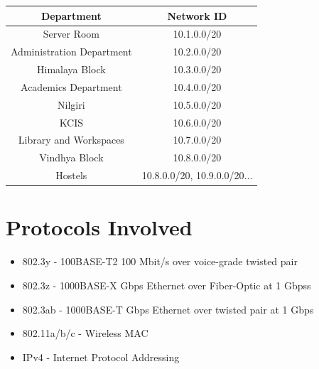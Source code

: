 \documentclass{article}
\begin{document}
\begin{center}
	\begin{tabular}{ |c|c| }
		\hline
		\textbf{Department} & \textbf{Network ID} \\ 
		\hline
		Server Room & 10.1.0.0/20 \\  
		\hline
		Administration Department & 10.2.0.0/20 \\
		\hline
		Himalaya Block & 10.3.0.0/20 \\
		\hline
		Academics Department & 10.4.0.0/20 \\
		\hline
		Nilgiri & 10.5.0.0/20 \\
		\hline
		KCIS & 10.6.0.0/20 \\
		\hline
		Library and Workspaces & 10.7.0.0/20 \\
		\hline
		Vindhya Block & 10.8.0.0/20 \\
		\hline
		Hostels & 10.8.0.0/20, 10.9.0.0/20...\\
		\hline
	\end{tabular}
\end{center}
\section{Protocols Involved}
\begin{itemize}
	\item 802.3y - 100BASE-T2 100 Mbit/s over voice-grade twisted pair 
	\item 802.3z - 1000BASE-X Gbps Ethernet over Fiber-Optic at 1 Gbpss
	\item 802.3ab - 1000BASE-T Gbps Ethernet over twisted pair at 1 Gbps
	\item 802.11a/b/c - Wireless MAC
	\item IPv4 - Internet Protocol Addressing
\end{itemize}
\end{document}
